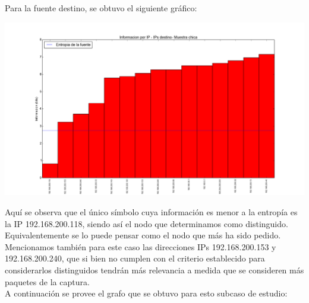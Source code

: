 \indent Para la fuente destino, se obtuvo el siguiente gráfico:

\includegraphics[scale=0.5,clip=true,trim=100 0 0 0]{graphics/laburo_chica_dst.png}

\indent Aquí se observa que el único símbolo cuya información es menor a la entropía es la IP 192.168.200.118, siendo así el nodo que determinamos como distinguido. Equivalentemente se lo puede pensar como el nodo que más ha sido pedido.\\
\indent Mencionamos también para este caso las direcciones IPs 192.168.200.153 y 192.168.200.240, que si bien no cumplen con el criterio establecido para considerarlos distinguidos tendrán más relevancia a medida que se consideren más paquetes de la captura.\\

\indent A continuación se provee el grafo que se obtuvo para esto subcaso de estudio:\\

